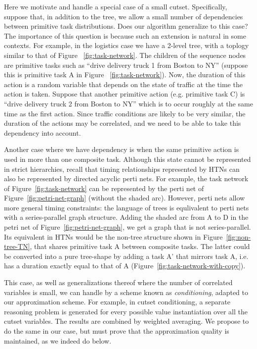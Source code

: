 \documentclass{article}
\begin{document}
Here we motivate and handle a special case of a small cutset. 
Specifically, suppose that, in addition to the tree, we allow a small number of dependencies
between primitive task distributions. Does our algorithm generalize to this case?
The importance of this question is because such an extension is natural in some contexts. For example,
in the logistics case we have a 2-level tree, with a toplogy similar to that of Figure ~\ref{fig:task-network}.
The children of the sequence nodes are primitive tasks such as
``drive delivery truck 1 from Boston to NY'' (suppose this is primitive task A in  Figure ~\ref{fig:task-network}).
Now, the duration of this action is a random variable
that depends on the state of traffic at the time the action is taken. Suppose that another
primitive action (e.g. primitive task C) is ``drive delivery truck 2 from Boston to NY'' which is to occur roughly at the
same time as the first action. Since traffic conditions are likely to be very similar, the
duration of the actions may be correlated, and we need to be able to take
this dependency into account.

Another case where we have dependency is when the same primitive action is 
used in more than one composite task. Although this state cannot be represented in
strict hierarchies, recall that timing relationships represented by HTNs can also be
represented by directed acyclic perti nets. For example, the task network of Figure~\ref{fig:task-network}
can be represented by the perti net of Figure~\ref{fig:petri-net-graph} (without the shaded arc). However, perti nets allow more general
timing constraints: the language of trees is equlivalent to perti nets with a series-parallel
graph structure. Adding the shaded arc from A to D in the petri net of Figure~\ref{fig:petri-net-graph}, 
we get a graph that is not series-parallel. Its equivalent in HTNs would be the non-tree structure
shown in Figure~\ref{fig:non-tree-TN}, that shares primitive task A between composite tasks. 
The latter could be converted into a pure tree-shape by adding a task A' that mirrors task A,
i.e. has a duration exactly equal to that of A (Figure~\ref{fig:task-network-with-copy}).

This case, as well as generalizations thereof where the number of correlated variables is small,
we can handle by a scheme known as {\em conditioning}, adapted to our approximation scheme.
For example, in cutset conditioning, a separate reasoning problem is generated
for every possible value instantiation over all the cutset variables. The results
are combined by weighted averaging. We propose to do the same in our case, but must prove
that the approximation quality is maintained, as we indeed do below.
\end{document}
